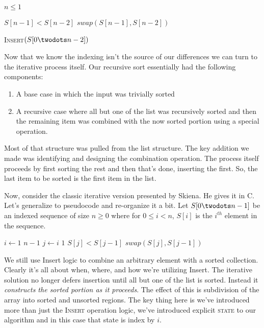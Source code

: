 \documentclass[]{tufte-handout}
\begin{document}
\begin{codebox}
\li \If $n \leq 1$
\li \Then
       \Return 
    \End

\li \If $S[n-1] < S[n-2]$
\li \Then 
	   $swap(S[n-1],S[n-2])$
	\End
	
\li \textsc{Insert}$(S[0 \twodots n-2])$
\end{codebox}

\begin{codebox}

\end{codebox}

Now that we know the indexing isn't the source of our differences we can turn to the iterative process itself. Our recursive sort essentially had the following components:
\begin{enumerate}
\item A base case in which the input was trivially sorted
\item A recursive case where all but one of the list was recursively sorted and then the remaining item was combined with the now sorted portion using a special operation.
\end{enumerate}
Most of that structure was pulled from the list structure.  The key addition we made was identifying and designing the combination operation. The process itself proceeds by first sorting the rest and then that's done, inserting the first. So, the last item to be sorted is the first item in the list. 

Now, consider the classic iterative version presented by Skiena. He gives it in C. Let's generalize to pseudocode and re-organize it a bit.  Let $S[0 \twodots n-1]$ be an indexed sequence of size $n\geq 0$ where for $0 \leq i < n$, $S[i]$ is the $i^{th}$ element in the sequence.
\begin{codebox}
\li \For $i \gets 1$ \To $n-1$ 
\li \Do 
		\For  $j \gets i$ \To $1$ 
\li 		\Do
			\If $S[j] < S[j-1]$
\li			\Then $swap(S[j],S[j-1])$
			\End
		\End
	\End
\end{codebox}

We still use Insert logic to combine an arbitrary element with a sorted collection. Clearly it's all about when, where, and how we're utilizing Insert. The iterative solution no longer defers insertion until all but one of the list is sorted. Instead it \textit{constructs the sorted portion as it proceeds}.  The effect of this is subdivision of the array into sorted and unsorted regions. The key thing here is we've introduced more than just the \textsc{Insert} operation logic, we've introduced explicit \textsc{state} to our algorithm and in this case that state is index by $i$. 
\end{document}

